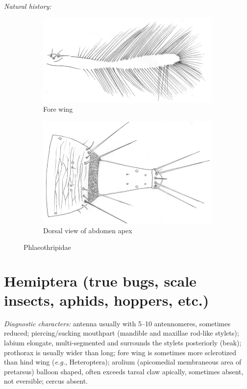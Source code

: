 \documentclass[letterpaper, 11pt]{article}
\begin{document}
\noindent{}\textit{Natural history:} \\

\begin{figure}[ht!]
 \centering
 \begin{subfigure}[ht!]{0.5\textwidth}
  \includegraphics[width=\textwidth]{PhlaeothripidWing}
  \caption{Fore wing \citep[][Fig. 6]{minaei2013}}
  \label{fig:phlaeothripid1}
 \end{subfigure}
 \qquad
 \begin{subfigure}[ht!]{0.3\textwidth}
  \includegraphics[width=\textwidth]{PhlaeothripidAbdomen}
  \caption{Dorsal view of abdomen apex \citep[][Fig. 9]{minaei2013}}
  \label{fig:phlaeothripid2}
 \end{subfigure}
 \caption{Phlaeothripidae}\label{fig:phlaeothripids}
\end{figure}

\section{Hemiptera (true bugs, scale insects, aphids, hoppers, etc.)}
\noindent{}\textit{Diagnostic characters:} antenna usually with 5--10 antennomeres, sometimes reduced; piercing/sucking mouthpart (mandible and maxillae rod-like stylets); labium elongate, multi-segmented and surrounds the stylets posteriorly (beak); prothorax is usually wider than long; fore wing is sometimes more sclerotized than hind wing (\textit{e.g.}, Heteroptera); arolium (apicomedial membraneous area of pretarsus) balloon shaped, often exceeds tarsal claw apically, sometimes absent, not eversible; cercus absent.\\
\end{document}
